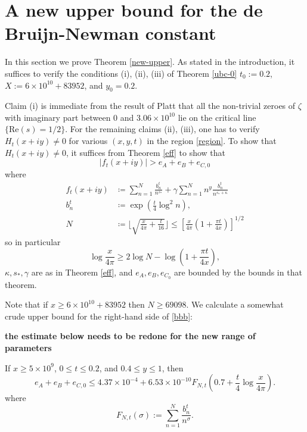 \section{A new upper bound for the de Bruijn-Newman constant}

In this section we prove Theorem \ref{new-upper}.  As stated in the introduction, it suffices to verify the conditions (i), (ii), (iii) of Theorem \ref{ubc-0} $t_0 := 0.2$, $X := 6 \times 10^{10} + 83952$, and $y_0 = 0.2$.  

Claim (i) is immediate from the result of Platt \cite{platt} that all the non-trivial zeroes of $\zeta$ with imaginary part between $0$ and $3.06 \times 10^{10}$ lie on the critical line $\{ \mathrm{Re}(s) = 1/2\}$.  For the remaining claims (ii), (iii), one has to verify $H_t(x+iy) \neq 0$ for various $(x,y,t)$ in the region \eqref{region}.
To show that $H_t(x+iy) \neq 0$, it suffices from Theorem \ref{eff} to show that
\begin{equation}\label{bbb}
|f_t(x+iy)| > e_A + e_B + e_{C,0} 
\end{equation}
where
\begin{align*}
f_t(x+iy) &\coloneqq \sum_{n=1}^N \frac{b_n^t}{n^{s_*}} + \gamma \sum_{n=1}^N n^y \frac{b_n^t}{n^{\overline{s_*} + \kappa}}\\
b_n^t &\coloneqq \exp( \frac{t}{4} \log^2 n),\\
N &\coloneqq \lfloor \sqrt{\frac{x}{4\pi} + \frac{t}{16}} \rfloor \leq [\frac{x}{4\pi} (1 + \frac{\pi t}{4x})]^{1/2}
\end{align*}
so in particular
\begin{equation}\label{logx}
 \log \frac{x}{4\pi} \geq 2 \log N - \log(1 + \frac{\pi t}{4x}),
\end{equation}
$\kappa, s_*, \gamma$ are as in Theorem \ref{eff}, and $e_A, e_B, e_{C_0}$ are bounded by the bounds in that theorem.

Note that if $x \geq 6 \times 10^{10} + 83952$ then $N \geq 69098$.  We calculate a somewhat crude upper bound for the right-hand side of \eqref{bbb}:

{\bf the estimate below needs to be redone for the new range of parameters}

\begin{lemma}\label{lac}  If $x \geq 5 \times 10^9$, $0 \leq t \leq 0.2$, and $0.4 \leq y \leq 1$, then
$$ e_A + e_B + e_{C,0} \leq 4.37 \times 10^{-4} + 6.53 \times 10^{-10} F_{N,t}(0.7 + \frac{t}{4} \log \frac{x}{4\pi}).$$
where
\begin{equation}\label{fnt-def}
 F_{N,t}( \sigma ) := \sum_{n=1}^N \frac{b_n^t}{n^\sigma}.
\end{equation}
\end{lemma}

